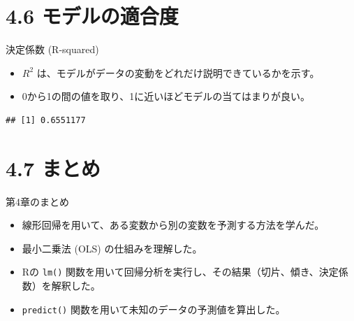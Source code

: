\documentclass[
  ignorenonframetext,
]{beamer}
\newenvironment{Shaded}{\begin{snugshade}}{\end{snugshade}}
\newcommand{\CommentTok}[1]{\textcolor[rgb]{0.56,0.35,0.01}{\textit{#1}}}
\newcommand{\FunctionTok}[1]{\textcolor[rgb]{0.00,0.00,0.00}{#1}}
\newcommand{\NormalTok}[1]{#1}
\newcommand{\SpecialCharTok}[1]{\textcolor[rgb]{0.00,0.00,0.00}{#1}}
\providecommand{\tightlist}{%
  \setlength{\itemsep}{0pt}\setlength{\parskip}{0pt}}
\begin{document}
\hypertarget{ux30e2ux30c7ux30ebux306eux9069ux5408ux5ea6}{%
\section{4.6
モデルの適合度}\label{ux30e2ux30c7ux30ebux306eux9069ux5408ux5ea6}}

\begin{frame}[fragile]{決定係数 (R-squared)}
\protect\hypertarget{ux6c7aux5b9aux4fc2ux6570-r-squared}{}
\begin{itemize}
\tightlist
\item
  \(R^2\) は、モデルがデータの変動をどれだけ説明できているかを示す。
\item
  0から1の間の値を取り、1に近いほどモデルの当てはまりが良い。
\end{itemize}

\begin{Shaded}
\end{Shaded}

\begin{verbatim}
## [1] 0.6551177
\end{verbatim}
\end{frame}

\hypertarget{ux307eux3068ux3081}{%
\section{4.7 まとめ}\label{ux307eux3068ux3081}}

\begin{frame}[fragile]{第4章のまとめ}
\protect\hypertarget{ux7b2c4ux7ae0ux306eux307eux3068ux3081}{}
\begin{itemize}
\tightlist
\item
  線形回帰を用いて、ある変数から別の変数を予測する方法を学んだ。
\item
  最小二乗法 (OLS) の仕組みを理解した。
\item
  Rの \texttt{lm()}
  関数を用いて回帰分析を実行し、その結果（切片、傾き、決定係数）を解釈した。
\item
  \texttt{predict()} 関数を用いて未知のデータの予測値を算出した。
\end{itemize}
\end{frame}
\end{document}
